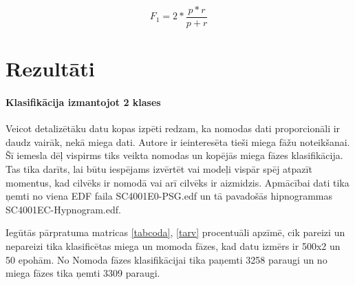 \documentclass[12pt,paper=A4]{report}
\begin{document}
\begin{equation}
F_1 = 2 * \frac{p*r}{p + r}
\label{eq:truePozitive}
\end{equation}









\chapter{Rezultāti}

\subsubsection*{Klasifikācija izmantojot 2 klases}


Veicot detalizētāku datu kopas izpēti redzam, ka nomodas dati proporcionāli ir daudz vairāk, nekā miega dati. Autore ir ieinteresēta tieši miega fāžu noteikšanai. Šī iemesla dēļ vispirms tiks veikta nomodas un kopējās miega fāzes klasifikācija. Tas tika darīts, lai būtu iespējams izvērtēt vai modeļi vispār spēj atpazīt momentus, kad cilvēks ir nomodā vai arī cilvēks ir aizmidzis. Apmācībai dati tika ņemti no viena EDF faila SC4001E0-PSG.edf un tā pavadošās hipnogrammas SC4001EC-Hypnogram.edf. 


Iegūtās pārpratuma matricas \ref{tabcoda}, \ref{tarv} procentuāli apzīmē, cik pareizi un nepareizi tika klasificētas miega un momoda fāzes, kad datu izmērs ir 500x2 un 50 epohām.
No Nomoda fāzes klasifikācijai tika paņemti 3258 paraugi un no miega fāzes tika ņemti 3309 paraugi.  
\end{document}
